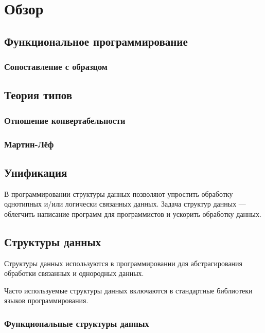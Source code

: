 \chapter{Обзор
}
\label{chapter1}

\section{Функциональное программирование}
\subsection{Сопоставление с образцом}
\section{Теория типов}
\subsection{Отношение конвертабельности}
\subsection{Мартин-Лёф}
\section{Унификация}

% 
%
%
В программировании структуры данных позволяют упростить обработку
однотипных и/или логически связанных данных.
Задача структур данных — облегчить написание программ для программистов и
ускорить обработку данных.

\section{Структуры данных}
Структуры данных используются в программировании для абстрагирования
обработки связанных и однородных данных.

Часто используемые структуры данных включаются в стандартные библиотеки
языков программирования.

\subsection{Функциональные структуры данных}

